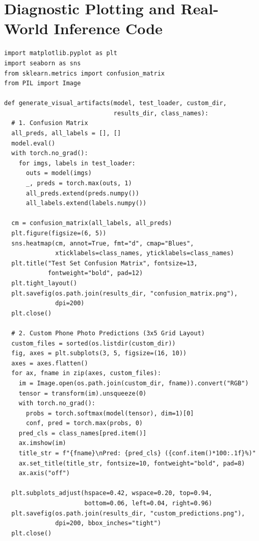 \documentclass[11pt,a4paper,oneside]{report}
\begin{document}
\section{Diagnostic Plotting and Real-World Inference Code}
\begin{lstlisting}[style=py, caption={Evaluation, Plot Generation and Subplot Alignment.}]
import matplotlib.pyplot as plt
import seaborn as sns
from sklearn.metrics import confusion_matrix
from PIL import Image

def generate_visual_artifacts(model, test_loader, custom_dir, 
                              results_dir, class_names):
  # 1. Confusion Matrix
  all_preds, all_labels = [], []
  model.eval()
  with torch.no_grad():
    for imgs, labels in test_loader:
      outs = model(imgs)
      _, preds = torch.max(outs, 1)
      all_preds.extend(preds.numpy())
      all_labels.extend(labels.numpy())
          
  cm = confusion_matrix(all_labels, all_preds)
  plt.figure(figsize=(6, 5))
  sns.heatmap(cm, annot=True, fmt="d", cmap="Blues", 
              xticklabels=class_names, yticklabels=class_names)
  plt.title("Test Set Confusion Matrix", fontsize=13, 
            fontweight="bold", pad=12)
  plt.tight_layout()
  plt.savefig(os.path.join(results_dir, "confusion_matrix.png"), 
              dpi=200)
  plt.close()
  
  # 2. Custom Phone Photo Predictions (3x5 Grid Layout)
  custom_files = sorted(os.listdir(custom_dir))
  fig, axes = plt.subplots(3, 5, figsize=(16, 10))
  axes = axes.flatten()
  for ax, fname in zip(axes, custom_files):
    im = Image.open(os.path.join(custom_dir, fname)).convert("RGB")
    tensor = transform(im).unsqueeze(0)
    with torch.no_grad():
      probs = torch.softmax(model(tensor), dim=1)[0]
      conf, pred = torch.max(probs, 0)
    pred_cls = class_names[pred.item()]
    ax.imshow(im)
    title_str = f"{fname}\nPred: {pred_cls} ({conf.item()*100:.1f}%)"
    ax.set_title(title_str, fontsize=10, fontweight="bold", pad=8)
    ax.axis("off")
      
  plt.subplots_adjust(hspace=0.42, wspace=0.20, top=0.94, 
                      bottom=0.06, left=0.04, right=0.96)
  plt.savefig(os.path.join(results_dir, "custom_predictions.png"), 
              dpi=200, bbox_inches="tight")
  plt.close()
\end{lstlisting}
\end{document}
